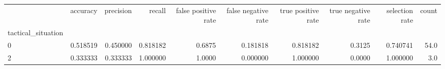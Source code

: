 \begin{tabular}{lrrrrrrrrr}
\toprule
{} &  accuracy &  precision &    recall &  false positive rate &  false negative rate &  true positive rate &  true negative rate &  selection rate &  count \\
tactical\_situation &           &            &           &                      &                      &                     &                     &                 &        \\
\midrule
0                  &  0.518519 &   0.450000 &  0.818182 &               0.6875 &             0.181818 &            0.818182 &              0.3125 &        0.740741 &   54.0 \\
2                  &  0.333333 &   0.333333 &  1.000000 &               1.0000 &             0.000000 &            1.000000 &              0.0000 &        1.000000 &    3.0 \\
\bottomrule
\end{tabular}
